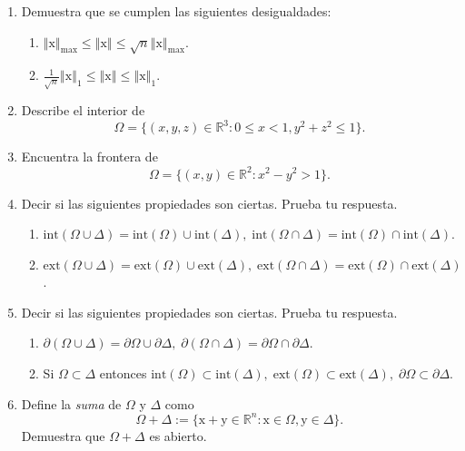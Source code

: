 \documentclass[12pt]{article}
\newcommand{\norm}[1]{\left\Vert#1\right\Vert}
\newcommand{\Ext}{\mathrm{ext}}
\newcommand{\Int}{\mathrm{int}}
\newcommand{\R}{\mathbb R}
\newcommand{\x}{\mathrm x}
\newcommand{\y}{\mathrm y}
\begin{document}
\begin{enumerate}
\begin{enumerate}[(1)]
\begin{itemize}
\end{itemize}
\item Describe las bolas unitarias en $\R^2$ con respecto a las normas $\norm{\x}_{\max}$ y $\norm{\x}_1$. 
\end{enumerate}

\item Demuestra que se cumplen las siguientes desigualdades:
\begin{enumerate}[(1)]
\item $\norm{\x}_{\max}\leq \norm{\x}\leq \sqrt{n}\norm{\x}_{\max}$.
\item $\frac{1}{\sqrt{n}}\norm{\x}_1\leq \norm{\x}\leq \norm{\x}_1$.
\end{enumerate}

\item Describe el interior de
\[ \Omega = \{ (x,y,z)\in \R^3 : 0\leq x < 1, y^2+z^2\leq 1\}. \]

\item Encuentra la frontera de 
\[ \Omega = \{ (x,y)\in \R^2 : x^2 - y^2 > 1 \}. \]

\item Decir si las siguientes propiedades son ciertas. Prueba tu respuesta.
\begin{enumerate}[(1)]
\item $\Int(\Omega\cup \Delta) = \Int(\Omega)\cup \Int(\Delta),\; \Int(\Omega\cap \Delta) = \Int(\Omega)\cap \Int(\Delta)$.
\item $\Ext(\Omega\cup \Delta) = \Ext(\Omega)\cup \Ext(\Delta),\; \Ext(\Omega\cap \Delta) = \Ext(\Omega)\cap \Ext(\Delta)$.
\end{enumerate}

\item Decir si las siguientes propiedades son ciertas. Prueba tu respuesta.
\begin{enumerate}[(1)]
\item $\partial(\Omega\cup \Delta) = \partial \Omega\cup \partial \Delta,\; 
\partial(\Omega\cap \Delta) = \partial \Omega\cap \partial \Delta$.
\item Si $\Omega\subset \Delta$ entonces $\Int(\Omega)\subset \Int(\Delta),\; \Ext(\Omega)\subset \Ext(\Delta),\; \partial \Omega\subset \partial \Delta$.
\end{enumerate}

\item Define la \emph{suma} de $\Omega$ y $\Delta$ como
\[ \Omega + \Delta := \{ \x+\y\in \R^n : \x\in \Omega, \y\in \Delta \}. \]
Demuestra que $\Omega + \Delta$ es abierto.


\end{enumerate}
\end{document}
